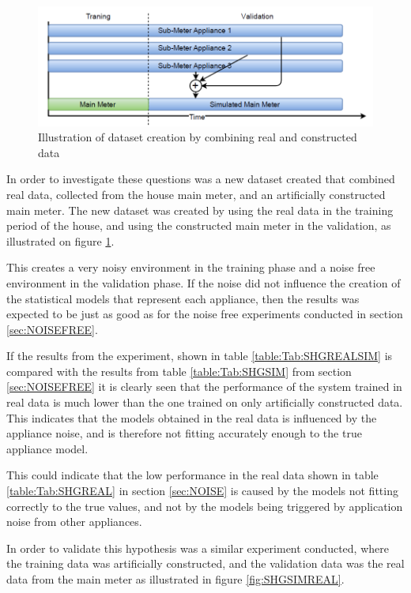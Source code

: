 \begin{figure}[H]
\centering
\includegraphics[width=1\textwidth]{billeder/REALSIM.png}
\caption{Illustration of dataset creation by combining real and constructed data}
\label{fig:REALSIMILU}
\end{figure}

In order to investigate these questions was a new dataset created that combined real data, collected from the house main meter, and an artificially constructed main meter. The new dataset was created by using the real data in the training period of the house, and using the constructed main meter in the validation, as illustrated on figure \ref{fig:REALSIMILU}.

This creates a very noisy environment in the training phase and a noise free environment in the validation phase. If the noise did not influence the creation of the statistical models that represent each appliance, then the results was expected to be just as good as for the noise free experiments conducted in section \ref{sec:NOISEFREE}.




If the results from the experiment, shown in table \ref{table:Tab:SHGREALSIM} is compared with the results from table \ref{table:Tab:SHGSIM} from section \ref{sec:NOISEFREE} it is clearly seen that the performance of the system trained in real data is much lower than the one trained on only artificially constructed data. This indicates that the models obtained in the real data is influenced by the appliance noise, and is therefore not fitting accurately enough to the true appliance model. 

This could indicate that the low performance in the real data shown in table \ref{table:Tab:SHGREAL} in section \ref{sec:NOISE} is caused by the models not fitting correctly to the true values, and not by the models being triggered by application noise from other appliances.

In order to validate this hypothesis was a similar experiment conducted, where the training data was artificially constructed, and the validation data was the real data from the main meter as illustrated in figure \ref{fig:SHGSIMREAL}. 


